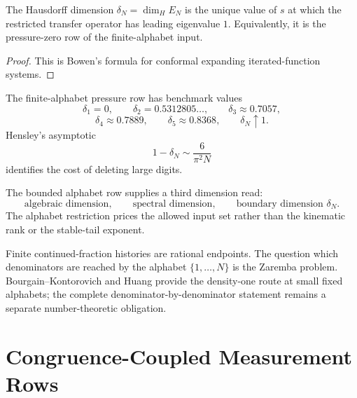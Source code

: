 \begin{theorem}
\label{thm:innovation-input-boundary-dimension-pressure-root}
The Hausdorff dimension $\delta_N=\dim_HE_N$ is the unique value of $s$ at
which the restricted transfer operator has leading eigenvalue $1$.
Equivalently, it is the pressure-zero row of the finite-alphabet input.
\end{theorem}

\begin{proof}
This is Bowen's formula for conformal expanding iterated-function systems.
\end{proof}

\begin{principle}
\label{prin:innovation-input-boundary-small-alphabet-dimensions}
The finite-alphabet pressure row has benchmark values
$$
\delta_1=0,
\qquad
\delta_2=0.5312805\ldots,
\qquad
\delta_3\approx0.7057,
$$
$$
\delta_4\approx0.7889,
\qquad
\delta_5\approx0.8368,
\qquad
\delta_N\uparrow1.
$$
Hensley's asymptotic
$$
1-\delta_N\sim\frac{6}{\pi^2N}
$$
identifies the cost of deleting large digits.
\end{principle}

\begin{principle}
\label{prin:innovation-input-boundary-third-dimension}
The bounded alphabet row supplies a third dimension read:
$$
\text{algebraic dimension},\qquad
\text{spectral dimension},\qquad
\text{boundary dimension }\delta_N.
$$
The alphabet restriction prices the allowed input set rather than the
kinematic rank or the stable-tail exponent.
\end{principle}

\begin{principle}
\label{prin:innovation-input-boundary-zaremba-interface}
Finite continued-fraction histories are rational endpoints. The question
which denominators are reached by the alphabet $\{1,\ldots,N\}$ is the
Zaremba problem. Bourgain--Kontorovich and Huang provide the density-one
route at small fixed alphabets; the complete denominator-by-denominator
statement remains a separate number-theoretic obligation.
\end{principle}

\section{Congruence-Coupled Measurement Rows}
\label{sec:innovation-input-boundary-congruence-measurement}

